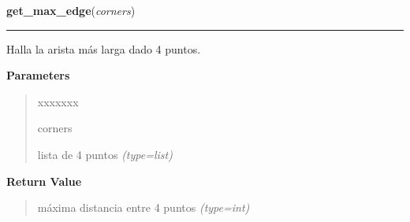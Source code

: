 \hspace{.8\funcindent}\begin{boxedminipage}{\funcwidth}

    \raggedright \textbf{get\_max\_edge}(\textit{corners})

    \vspace{-1.5ex}

    \rule{\textwidth}{0.5\fboxrule}
\setlength{\parskip}{2ex}
Halla la arista más larga dado 4 puntos.

\setlength{\parskip}{1ex}
      \textbf{Parameters}
      \vspace{-1ex}

      \begin{quote}
        \begin{Ventry}{xxxxxxx}

          \item[corners]


lista de 4 puntos
            {\it (type=list)}

        \end{Ventry}

      \end{quote}

      \textbf{Return Value}
    \vspace{-1ex}

      \begin{quote}

máxima distancia entre 4 puntos
      {\it (type=int)}

      \end{quote}

    \end{boxedminipage}

    \label{src:functions:get_external_corners}

    \vspace{0.5ex}

